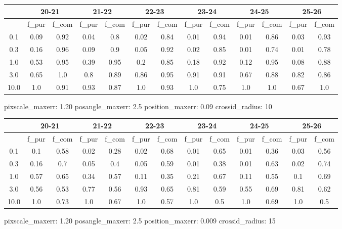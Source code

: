 \documentclass{article}
\begin{document}
\begin{figure}[H]
\centering
\begin{tabular}{|c|c|c|c|c|c|c|c|c|c|c|c|c|}
\hline
\multicolumn{1}{|c|}{} & \multicolumn{2}{|c|}{20-21} & \multicolumn{2}{|c|}{21-22} & \multicolumn{2}{|c|}{22-23} & \multicolumn{2}{|c|}{23-24} & \multicolumn{2}{|c|}{24-25} & \multicolumn{2}{|c|}{25-26}\\
\hline \hline
 & f\_pur & f\_com & f\_pur & f\_com & f\_pur & f\_com & f\_pur & f\_com & f\_pur & f\_com & f\_pur & f\_com \\
\hline
0.1 & 0.09 & 0.92 & 0.04 & 0.8 & 0.02 & 0.84 & 0.01 & 0.94 & 0.01 & 0.86 & 0.03 & 0.93\\
\hline
0.3 & 0.16 & 0.96 & 0.09 & 0.9 & 0.05 & 0.92 & 0.02 & 0.85 & 0.01 & 0.74 & 0.01 & 0.78\\
\hline
1.0 & 0.53 & 0.95 & 0.39 & 0.95 & 0.2 & 0.85 & 0.18 & 0.92 & 0.12 & 0.95 & 0.08 & 0.88\\
\hline
3.0 & 0.65 & 1.0 & 0.8 & 0.89 & 0.86 & 0.95 & 0.91 & 0.91 & 0.67 & 0.88 & 0.82 & 0.86\\
\hline
10.0 & 1.0 & 0.91 & 0.93 & 0.87 & 1.0 & 0.93 & 1.0 & 0.75 & 1.0 & 1.0 & 0.67 & 1.0\\
\hline
\end{tabular}
\caption{pixscale\_maxerr: 1.20 posangle\_maxerr: 2.5 position\_maxerr: 0.09 crossid\_radius: 10}
\end{figure}

\begin{figure}[H]
\centering
\begin{tabular}{|c|c|c|c|c|c|c|c|c|c|c|c|c|}
\hline
\multicolumn{1}{|c|}{} & \multicolumn{2}{|c|}{20-21} & \multicolumn{2}{|c|}{21-22} & \multicolumn{2}{|c|}{22-23} & \multicolumn{2}{|c|}{23-24} & \multicolumn{2}{|c|}{24-25} & \multicolumn{2}{|c|}{25-26}\\
\hline \hline
 & f\_pur & f\_com & f\_pur & f\_com & f\_pur & f\_com & f\_pur & f\_com & f\_pur & f\_com & f\_pur & f\_com \\
\hline
0.1 & 0.1 & 0.58 & 0.02 & 0.28 & 0.02 & 0.68 & 0.01 & 0.65 & 0.01 & 0.36 & 0.03 & 0.56\\
\hline
0.3 & 0.16 & 0.7 & 0.05 & 0.4 & 0.05 & 0.59 & 0.01 & 0.38 & 0.01 & 0.63 & 0.02 & 0.74\\
\hline
1.0 & 0.57 & 0.65 & 0.34 & 0.57 & 0.11 & 0.35 & 0.21 & 0.67 & 0.11 & 0.55 & 0.1 & 0.69\\
\hline
3.0 & 0.56 & 0.53 & 0.77 & 0.56 & 0.93 & 0.65 & 0.81 & 0.59 & 0.55 & 0.69 & 0.81 & 0.62\\
\hline
10.0 & 1.0 & 0.73 & 1.0 & 0.67 & 1.0 & 0.57 & 1.0 & 0.5 & 1.0 & 0.69 & 1.0 & 0.5\\
\hline
\end{tabular}
\caption{pixscale\_maxerr: 1.20 posangle\_maxerr: 2.5 position\_maxerr: 0.009 crossid\_radius: 15}
\end{figure}
\end{document}
